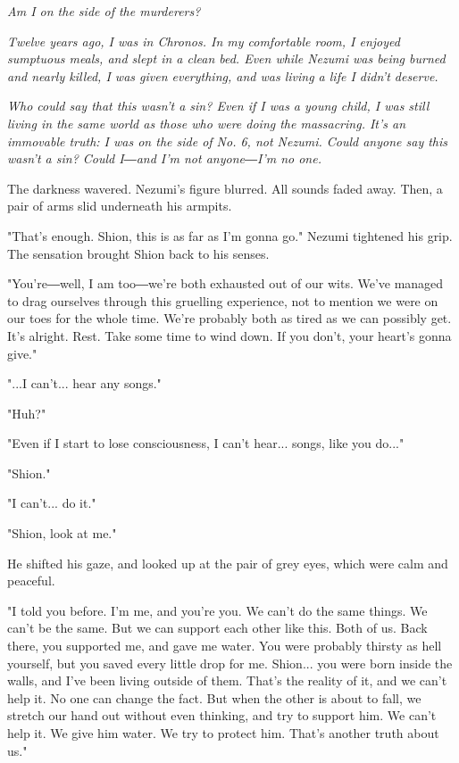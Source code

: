 \emph{Am I on the side of the murderers?}

\emph{Twelve years ago, I was in Chronos. In my comfortable room, I enjoyed
	sumptuous meals, and slept in a clean bed. Even while Nezumi was being
	burned and nearly killed, I was given everything, and was living a life
	I didn't deserve.}

\emph{Who could say that this wasn't a sin? Even if I was a young child, I was
	still living in the same world as those who were doing the massacring.
	It's an immovable truth: I was on the side of No. 6, not Nezumi. Could
	anyone say this wasn't a sin? Could I―and I'm not anyone―I'm no one.}

The darkness wavered. Nezumi's figure blurred. All sounds faded away.
Then, a pair of arms slid underneath his armpits.

"That's enough. Shion, this is as far as I'm gonna go." Nezumi tightened
his grip. The sensation brought Shion back to his senses.

"You're―well, I am too―we're both exhausted out of our wits. We've
managed to drag ourselves through this gruelling experience, not to
mention we were on our toes for the whole time. We're probably both as
tired as we can possibly get. It's alright. Rest. Take some time to wind
down. If you don't, your heart's gonna give."

"...I can't... hear any songs."

"Huh?"

"Even if I start to lose consciousness, I can't hear... songs, like you
do..."

"Shion."

"I can't... do it."

"Shion, look at me."

He shifted his gaze, and looked up at the pair of grey eyes, which were
calm and peaceful.

"I told you before. I'm me, and you're you. We can't do the same things.
We can't be the same. But we can support each other like this. Both of
us. Back there, you supported me, and gave me water. You were probably
thirsty as hell yourself, but you saved every little drop for me.
Shion... you were born inside the walls, and I've been living outside of
them. That's the reality of it, and we can't help it. No one can change
the fact. But when the other is about to fall, we stretch our hand out
without even thinking, and try to support him. We can't help it. We give
him water. We try to protect him. That's another truth about us."

